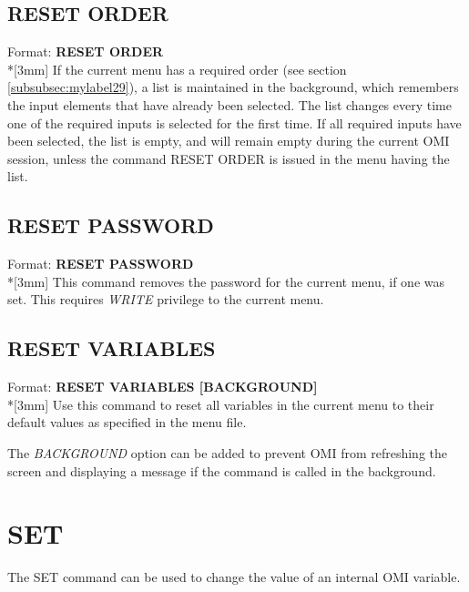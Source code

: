 \documentclass[a4paper]{book}
\renewcommand{\indent}{\hspace*{5mm}}
\begin{document}
\subsection{RESET ORDER}
\label{subsubsec:mylabel72}

\indent Format: \textbf{RESET ORDER}\\*[3mm]
If the current menu has a required order (see section 
\ref{subsubsec:mylabel29}), a list is maintained in the background, 
which remembers the input elements that have already been selected. The list 
changes every time one of the required inputs is selected for the first 
time. If all required inputs have been selected, the list is empty, and will 
remain empty during the current OMI session, unless the command \textsf{RESET ORDER} 
is issued in the menu having the list.

\subsection{RESET PASSWORD}
\label{subsubsec:mylabel73}

\indent Format: \textbf{RESET PASSWORD}\dag\\*[3mm]
This command removes the password for the current menu, if one was set. This 
requires \textsl{WRITE} privilege to the current menu.

\subsection{RESET VARIABLES}
\label{subsubsec:resetvar}

\indent Format: \textbf{RESET VARIABLES [BACKGROUND]}\\*[3mm]
Use this command to reset all variables in the current menu to
their default values as specified in the menu file.

The \textsl{BACKGROUND} option can be added to prevent OMI from refreshing the
screen and displaying a message if the command is called in the background.

\section{SET}
\label{subsec:mylabel20}

The \textsf{SET} command can be used to change the value of an internal OMI variable.
\end{document}
